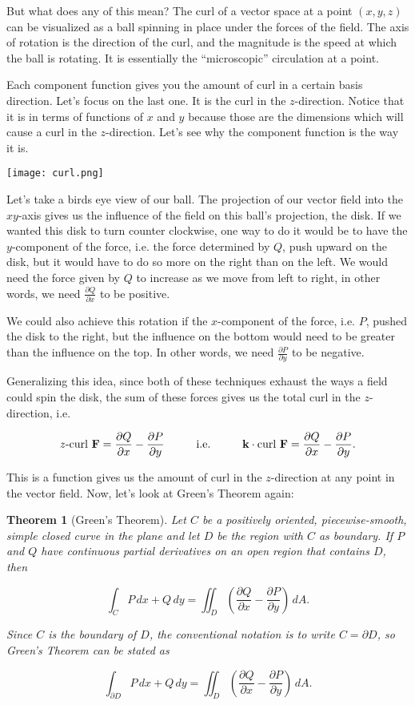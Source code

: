 \documentclass[11pt,oneside,english]{amsart}
\newtheorem{theorem}{Theorem}
\theoremstyle{definition}
\newcommand{\pspace}{\hspace{10mm}}
\newcommand{\pp}[2]{\frac{\partial{#1}}{\partial{#2}}}
\begin{document}
But what does any of this mean? The curl of a vector space at a point $(x,y,z)$ can be visualized as a ball spinning in place under the forces of the field. The axis of rotation is the direction of the curl, and the magnitude is the speed at which the ball is rotating. It is essentially the ``microscopic'' circulation at a point. 

Each component function gives you the amount of curl in a certain basis direction. Let's focus on the last one. It is the curl in the $z$-direction. Notice that it is in terms of functions of $x$ and $y$ because those are the dimensions which will cause a curl in the $z$-direction. Let's see why the component function is the way it is.

\begin{center}
\texttt{[image: curl.png]}
\end{center}

Let's take a birds eye view of our ball. The projection of our vector field into the $xy$-axis gives us the influence of the field on this ball's projection, the disk. If we wanted this disk to turn counter clockwise, one way to do it would be to have the $y$-component of the force, i.e. the force determined by $Q$, push upward on the disk, but it would have to do so more on the right than on the left. We would need the force given by $Q$ to increase as we move from left to right, in other words, we need $\pp{Q}{x}$ to be positive.

We could also achieve this rotation if the $x$-component of the force, i.e. $P$, pushed the disk to the right, but the influence on the bottom would need to be greater than the influence on the top. In other words, we need $\pp{P}{y}$ to be negative. 

Generalizing this idea, since both of these techniques exhaust the ways a field could spin the disk, the sum of these forces gives us the total curl in the $z$-direction, i.e.

\[
z\text{-curl }\mathbf{F}=\pp{Q}{x}-\pp{P}{y}\pspace \text{i.e.}\pspace \mathbf{k}\cdot\text{curl }\mathbf{F}=\pp{Q}{x}-\pp{P}{y}.
\]


This is a function gives us the amount of curl in the $z$-direction at any point in the vector field. Now, let's look at Green's Theorem again:

\begin{theorem}[Green's Theorem]
Let $C$ be a positively oriented, piecewise-smooth, simple closed curve in the plane and let $D$ be the region with $C$ as boundary. If $P$ and $Q$ have continuous partial derivatives on an open region that contains $D$, then

\[
\int_CP\,dx + Q\,dy=\iint_D\left(\pp{Q}{x}-\pp{P}{y}\right)\,dA.
\]

Since $C$ is the boundary of $D$, the conventional notation is to write $C=\partial D$, so Green's Theorem can be stated as

\[
\int_{\partial D}P\,dx + Q\,dy=\iint_D\left(\pp{Q}{x}-\pp{P}{y}\right)\,dA.
\]

\end{theorem}
\end{document}

